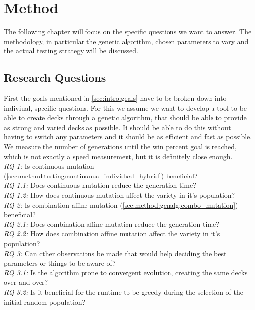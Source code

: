 \chapter{Method}
\label{ch:method}
The following chapter will focus on the specific questions we want to answer. The methodology, in particular the genetic algorithm, chosen parameters to vary and the actual testing strategy will be discussed.

\section{Research Questions}
\label{sec:method:quest}
First the goals mentioned in \ref{sec:intro:goals} have to be broken down into indiviual, specific questions. For this we assume we want to develop a tool to be able to create decks through a genetic algorithm, that should be able to provide as strong and varied decks as possible. It should be able to do this without having to switch any parameters and it should be as efficient and fast as possible. We measure the number of generations until the win percent goal is reached, which is not exactly a speed measurement, but it is definitely close enough.\\

	\emph{RQ 1:} Is continuous mutation (\ref{sec:method:testing:continuous_individual_hybrid}) beneficial?\\
		\emph{RQ 1.1:} Does continuous mutation reduce the generation time?\\
		\emph{RQ 1.2:} How does continuous mutation affect the variety in it's population?\\
	\emph{RQ 2:} Is combination affine mutation (\ref{sec:method:genalg:combo_mutation}) beneficial?\\
		\emph{RQ 2.1:} Does combination affine mutation reduce the generation time?\\
		\emph{RQ 2.2:} How does combination affine mutation affect the variety in it's population?\\
	\emph{RQ 3:} Can other observations be made that would help deciding the best parameters or things to be aware of?\\
		\emph{RQ 3.1:} Is the algorithm prone to convergent evolution, creating the same decks over and over?\\
		\emph{RQ 3.2:} Is it beneficial for the runtime to be greedy during the selection of the initial random population?\\

